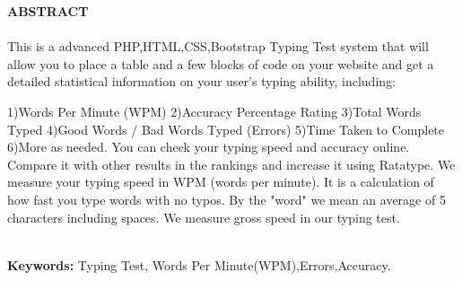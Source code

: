 \begin{center}
\thispagestyle{empty}
\vspace{2cm}
\LARGE{\textbf{ABSTRACT}}\\[1.0cm]
\end{center}
\thispagestyle{empty}
\large{\paragraph{}
This is a advanced PHP,HTML,CSS,Bootstrap Typing Test system that will allow you to place a table and a few blocks of code on your website and get a detailed statistical information on your user's typing ability, including:

    1)Words Per Minute (WPM)
    2)Accuracy Percentage Rating
    3)Total Words Typed
    4)Good Words / Bad Words Typed (Errors)
    5)Time Taken to Complete
    6)More as needed.
    You can check your typing speed and accuracy online. Compare it with other results in the rankings and increase it using Ratatype. We measure your typing speed in WPM (words per minute). It is a calculation of how fast you type words with no typos. By the "word" we mean an average of 5 characters including spaces. We measure gross speed in our typing test. \\
}
\textbf{ \Large{ \\ Keywords:} } Typing Test, Words Per Minute(WPM),Errors,Accuracy.